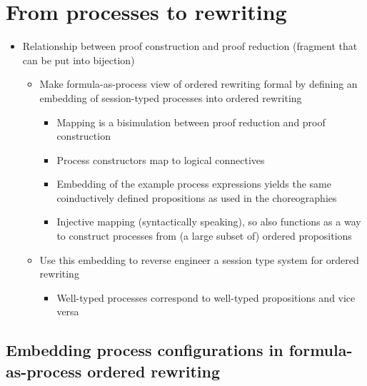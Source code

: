 \chapter{From processes to rewriting}\label{ch:correspond}


\begin{itemize}
\item Relationship between proof construction and proof reduction (fragment that can be put into bijection)
  \begin{itemize}[nosep]
  \item Make formula-as-process view of ordered rewriting formal by defining an embedding of session-typed processes into ordered rewriting
    \begin{itemize}[nosep]
    \item Mapping is a bisimulation between proof reduction and proof construction
    \item Process constructors map to logical connectives
    \item Embedding of the example process expressions yields the same coinductively defined propositions as used in the choreographies
    \item Injective mapping (syntactically speaking), so also functions as a way to construct processes from (a large subset of) ordered propositions
    \end{itemize}
  \item Use this embedding to reverse engineer a session type system for ordered rewriting
    \begin{itemize}[nosep]
    \item Well-typed processes correspond to well-typed propositions and vice versa
    \end{itemize}
  \end{itemize}
\end{itemize}

\section{Embedding process configurations in formula-as-process ordered rewriting}\label{sec:correspond:embed}

